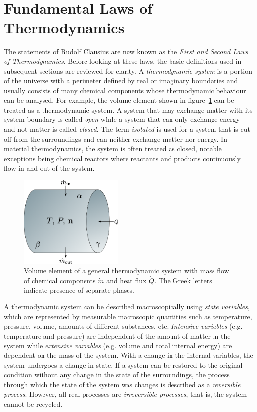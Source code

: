 \section{Fundamental Laws of Thermodynamics}
    The statements of Rudolf Clausius are now known as the \emph{First and Second Laws of Thermodynamics}. Before looking at these laws, the basic definitions used in subsequent sections are reviewed for clarity. A \emph{thermodynamic system} is a portion of the universe with a perimeter defined by real or imaginary boundaries and usually consists of many chemical components whose thermodynamic behaviour can be analysed. For example, the volume element shown in figure~\ref{fig:system} can be treated as a thermodynamic system. A system that may exchange matter with its system boundary is called \emph{open} while a system that can only exchange energy and not matter is called \emph{closed}. The term \emph{isolated} is used for a system that is cut off from the surroundings and can neither exchange matter nor energy. In material thermodynamics, the system is often treated as closed, notable exceptions being chemical reactors where reactants and products continuously flow in and out of the system.
    \begin{figure}[htb]
        \centering
        \includegraphics[width=0.45\textwidth]{figures/chapter-3/system.png}
        \caption{Volume element of a general thermodynamic system with mass flow of chemical components $\dot{m}$ and heat flux $\dot{Q}$. The Greek letters indicate presence of separate phases.}
        \label{fig:system}
    \end{figure}

    A thermodynamic system can be described macroscopically using \emph{state variables}, which are represented by measurable macroscopic quantities such as temperature, pressure, volume, amounts of different substances, etc. \emph{Intensive variables} (e.g. temperature and pressure)  are independent of the amount of matter in the system  while  \emph{extensive variables} (e.g. volume and total internal energy) are dependent on the mass of the system.  With a change in the internal variables, the system undergoes a change in state. If a system can be restored to the original condition without any change in the state of the surroundings, the process through which the state of the system was changes is described as a \emph{reversible process}. However, all real processes are \emph{irreversible processes}, that is, the system cannot be recycled.

